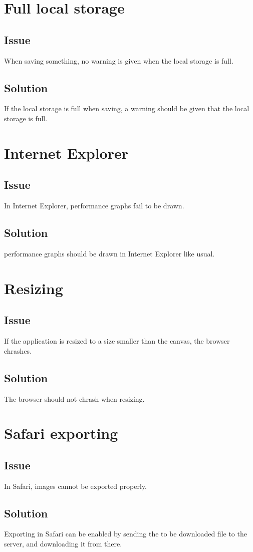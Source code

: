 \section{Full local storage}

\subsection*{Issue}
When saving something, no warning is given when the local storage is full.

\subsection*{Solution}
If the local storage is full when saving, a warning should be given that the local storage is full.

\section{Internet Explorer}

\subsection*{Issue}
In Internet Explorer, performance graphs fail to be drawn.

\subsection*{Solution}
performance graphs should be drawn in Internet Explorer like usual.\

\section{Resizing}

\subsection*{Issue}
If the application is resized to a size smaller than the canvas, the browser chrashes.

\subsection*{Solution}
The browser should not chrash when resizing.

\section{Safari exporting}

\subsection*{Issue}
In Safari, images cannot be exported properly.

\subsection*{Solution}
Exporting in Safari can be enabled by sending the to be downloaded file to the server, and downloading it from there.